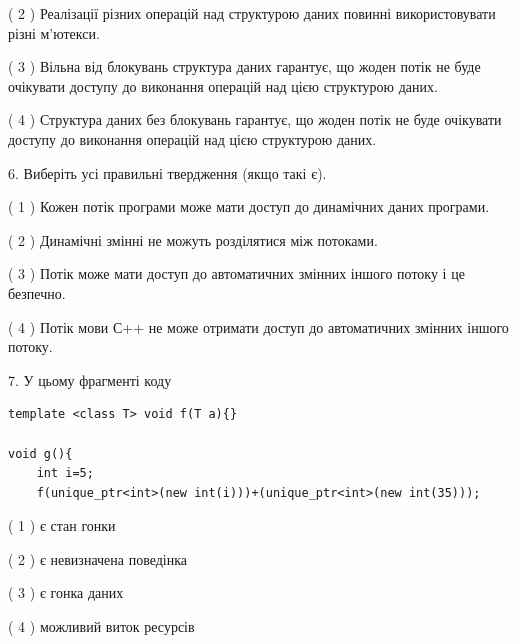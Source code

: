 \documentclass[12pt, ukrainian]{article}
\begin{document}
\begin {large}
{( 2 ) Реалізації різних операцій над структурою даних повинні використовувати різні м’ютекси.%

( 3 ) Вільна від блокувань структура даних гарантує, що жоден потік не буде очікувати доступу до виконання операцій над цією структурою даних.%

( 4 ) Структура даних без блокувань гарантує, що жоден потік не буде очікувати доступу до виконання операцій над цією структурою даних.%
\newpage



\vspace{5mm}
6. Виберіть усі правильні твердження (якщо такі є).\par
\vspace{2mm}

( 1 ) Кожен потік програми може мати доступ до динамічних даних програми.%

( 2 ) Динамічні змінні не можуть розділятися між потоками.%

( 3 ) Потік може мати доступ до автоматичних змінних іншого потоку і це безпечно.%

( 4 ) Потік мови С++ не може отримати доступ до автоматичних змінних іншого потоку.%


\vspace{5mm}
7. У цьому фрагменті коду
\begin{verbatim}
template <class T> void f(T a){}

void g(){
    int i=5;
    f(unique_ptr<int>(new int(i)))+(unique_ptr<int>(new int(35)));
\end{verbatim}
( 1 ) є стан гонки%

( 2 ) є невизначена поведінка%

( 3 ) є гонка даних%

( 4 ) можливий виток ресурсів%
}
\end {large}
\end{document}
